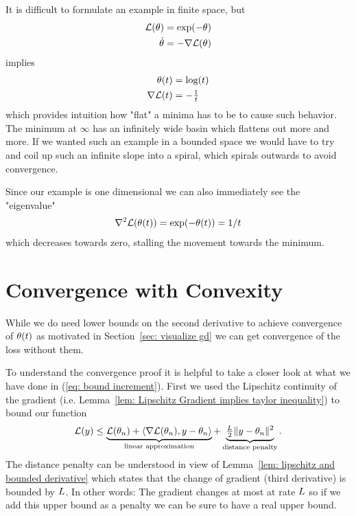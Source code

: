 It is difficult to formulate an example in finite space, but
%
\begin{align*}
	\mathcal{L}(\theta) &= \exp(-\theta) \\
	\dot{\theta} &= -\nabla \mathcal{L}(\theta)
\end{align*}
%
implies
%
\begin{align*}
	\theta(t) &= \log(t)\\
	\nabla \mathcal{L}(t) &= -\tfrac1t
\end{align*}
%
which provides intuition how "flat" a minima has to be to cause such behavior.
The minimum at \(\infty\) has an infinitely wide basin which flattens out
more and more. If we wanted such an example in a bounded space we would have
to try and coil up such an infinite slope into a spiral, which spirals outwards
to avoid convergence.

Since our example is one dimensional we can also immediately see the "eigenvalue"
%
\begin{align*}
	\nabla^2 \mathcal{L}(\theta(t)) = \exp(-\theta(t)) = 1/t
\end{align*}
%
which decreases towards zero, stalling the movement towards the minimum.

\section{Convergence with Convexity}\label{sec: convex convergence theorems}

While we do need lower bounds on the second derivative to achieve convergence
of \(\theta(t)\) as motivated in Section~\ref{sec: visualize gd} we can get
convergence of the loss without them.

To understand the convergence proof it is helpful to take a closer look at
what we have done in (\ref{eq: bound increment}). First we used the Lipschitz
continuity of the gradient (i.e. Lemma~\ref{lem: Lipschitz Gradient implies taylor inequality})
to bound our function
%
\begin{align}\label{eq: lin approx + distance penalty notion}
	\mathcal{L}(y)
	\le \underbrace{
		\mathcal{L}(\theta_n)+ \langle\nabla\mathcal{L}(\theta_n), y-\theta_n\rangle 
	}_{\text{linear approximation}}
	+ \underbrace{\tfrac{L}{2} \|y-\theta_n\|^2}_{\text{distance penalty}}.
\end{align}
%
The distance penalty can be understood in view of Lemma~\ref{lem: lipschitz and bounded derivative}
which states that the change of gradient (third derivative) is bounded by \(L\).
In other words: The gradient changes at most at rate \(L\) so if we
add this upper bound as a penalty we can be sure to have a real upper bound.

